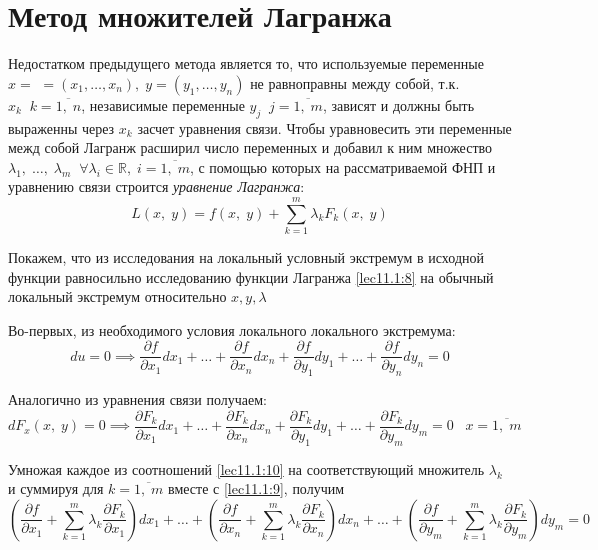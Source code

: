 \documentclass[../../main.tex]{subfiles}
\begin{document}
	\section{Метод множителей Лагранжа} 
	
	Недостатком предыдущего метода является то, что используемые переменные 
	$x = $ $=\left(x_1, \ldots, x_n\right), \; y = \left(y_1,\ldots, y_n\right)$
	не равноправны между собой, т.к. $x_k \;\; k = \overline{1,\; n}$, 
	независимые переменные $y_j \;\; j = \overline{1,\; m}$, зависят и 
	должны быть выраженны через $x_k$ засчет уравнения связи. 
	Чтобы уравновесить эти переменные межд собой Лагранж расширил 
	число переменных и добавил к ним множество 
	$\lambda_1,\; \ldots,\; \lambda_m \;\; \forall 
	\lambda_i \in \mathbb{R}, \; i = \overline{1,\; m}$, 
	с помощью которых на рассматриваемой ФНП и уравнению 
	связи строится \emph{уравнение Лагранжа}:
	\[
	L\left(x, \; y\right) = f\left(x, \; y\right) + \sum\limits_{k = 1}^m 
	\lambda_k F_k\left(x, \; y\right) \label{lec11.1:8}
	\]
	
	
	Покажем, что из исследования на локальный условный экстремум в исходной 
	функции равносильно исследованию функции Лагранжа 
	\eqref{lec11.1:8} на обычный локальный экстремум относительно $x, y,\lambda$
	
	Во-первых, из необходимого условия локального локального экстремума:
	\[
	du = 0 \implies \dfrac{\partial f}{\partial x_1} dx_1 + \ldots + 
	\dfrac{\partial f}{\partial x_n} dx_n + \dfrac{\partial f}{\partial y_1}dy_1
	 + \ldots + \dfrac{\partial f}{\partial y_n} dy_n = 0 \label{lec11.1:9}
	\]
	
	Аналогично из уравнения связи получаем:
	\begin{equation}
	dF_x\left(x, \; y\right) = 0 \implies \dfrac{\partial 
	F_k}{\partial x_1}dx_1 + 
	\ldots + \dfrac{\partial F_k}{\partial x_n}dx_n + 
	\dfrac{\partial F_k}{\partial y_1}dy_1 + \ldots + 
	\dfrac{\partial F_k}{\partial y_m}dy_m = 0 \;\;\; x = \overline{1, \; m} 
	\label{lec11.1:10}
	\end{equation}
	
	Умножая каждое из соотношений \eqref{lec11.1:10} на соответствующий множитель 
	$\lambda_k$ и суммируя для $k = \overline{1,\;m}$ 
	вместе с \eqref{lec11.1:9}, получим
	\begin{equation}
	\left(\dfrac{\partial f}{\partial x_1} + \sum\limits_{k
	= 1}^m \lambda_k \dfrac{\partial F_k}{\partial x_1} 
	\right)dx_1 + \ldots + \left(\dfrac{\partial f}
	{\partial x_n} + \sum\limits_{k = 1}^m \lambda_k 
	\dfrac{\partial F_k}{\partial x_n} \right)dx_n + \ldots 
	+ \left(\dfrac{\partial f}{\partial y_m} + 
	\sum\limits_{k = 1}^m \lambda_k \dfrac{\partial F_k}
	{\partial y_m} \right)dy_m = 0 \label{lec11.1:11}
	\end{equation}
	
\end{document}
